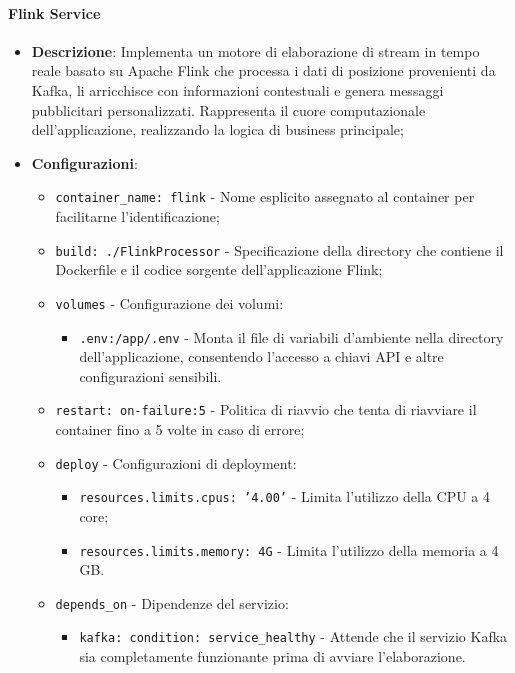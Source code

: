 \documentclass[10pt]{article}
\begin{document}
        \paragraph{Flink Service}
        \begin{itemize} 
        \item \textbf{Descrizione}: Implementa un motore di elaborazione di stream in tempo reale basato su Apache Flink che processa i dati di posizione provenienti da Kafka, li arricchisce con informazioni contestuali e genera messaggi pubblicitari personalizzati. Rappresenta il cuore computazionale dell'applicazione, realizzando la logica di business principale;
        \item \textbf{Configurazioni}:
        \begin{itemize}
            \item \texttt{container\_name: flink} - Nome esplicito assegnato al container per facilitarne l'identificazione;
            \item \texttt{build: ./FlinkProcessor} - Specificazione della directory che contiene il Dockerfile e il codice sorgente dell'applicazione Flink;
            \item \texttt{volumes} - Configurazione dei volumi:
            \begin{itemize}
                \item \texttt{.env:/app/.env} - Monta il file di variabili d'ambiente nella directory dell'applicazione, consentendo l'accesso a chiavi API e altre configurazioni sensibili.
            \end{itemize}
            \item \texttt{restart: on-failure:5} - Politica di riavvio che tenta di riavviare il container fino a 5 volte in caso di errore;
            \item \texttt{deploy} - Configurazioni di deployment:
            \begin{itemize}
                \item \texttt{resources.limits.cpus: '4.00'} - Limita l'utilizzo della CPU a 4 core;
                \item \texttt{resources.limits.memory: 4G} - Limita l'utilizzo della memoria a 4 GB.
            \end{itemize}
            \item \texttt{depends\_on} - Dipendenze del servizio:
            \begin{itemize}
                \item \texttt{kafka: condition: service\_healthy} - Attende che il servizio Kafka sia completamente funzionante prima di avviare l'elaborazione.
            \end{itemize}
        \end{itemize}
        

\end{itemize}
\end{document}
